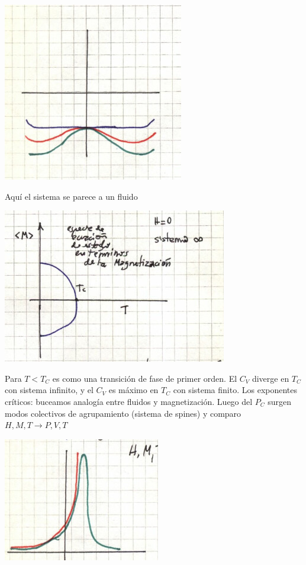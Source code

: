\documentclass[10pt,oneside]{CBFT_book}
\begin{document}
\includegraphics[scale=0.4]{images/1606337033.jpg}

Aquí el sistema se parece a un fluido

\includegraphics[scale=0.4]{images/1606337037.jpg}

Para $T<T_C$ es como una transición de fase de primer orden. El $C_V$ diverge en $T_C$ con sistema infinito,
y el $C_V$ es máximo en $T_C$ con sistema finito.
Los exponentes críticos: buceamos analogía entre fluidos y magnetización.
Luego del $P_C$ surgen modos colectivos de agrupamiento (sistema de spines) y comparo $H,M,T \to P,V,T$

\includegraphics[scale=0.4]{images/1606337041.jpg}
\end{document}
